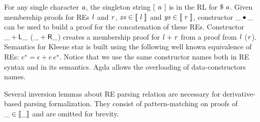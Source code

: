\documentclass[sigplan, anonymous, review]{acmart}
\theoremstyle{definition}
\newcommand{\D}[1]{\blue{\mathsf{#1}}}
\newcommand{\C}[1]{\red{\mathsf{#1}}}
\newcommand{\V}[1]{\purple{\mathit{#1}}}
\begin{document}
For any single character \ensuremath{\V{a}}, the singleton
string \ensuremath{[\mskip1.5mu \;\V{a}\;\mskip1.5mu]} is in the RL
for \ensuremath{\C{\$}\;\V{a}}. Given membership proofs for REs
\ensuremath{\V{l}} and \ensuremath{\V{r}}, \ensuremath{\V{xs}\;\D{\in\llbracket}\;\V{l}\;\D{\rrbracket}} and \ensuremath{\V{ys}\;\D{\in\llbracket}\;\V{r}\;\D{\rrbracket}}, constructor
\ensuremath{\C{\_\bullet\_}} can be used to build a proof
for the concatenation of these REs.  Constructor
\ensuremath{\C{\_+L\_}} (\ensuremath{\C{\_+R\_}}) creates a membership proof
for \ensuremath{\V{l}\;\C{+}\;\V{r}} from a proof from \ensuremath{\V{l}} (\ensuremath{\V{r}}). Semantics for Kleene star
is built using the following well known equivalence of REs: $e^\star
= \epsilon + e\,e^\star$. Notice that we use the same constructor names both in RE syntax and 
in its semantics. Agda allows the overloading of data-constructors names.

Several inversion lemmas about RE parsing relation are necessary for
derivative-based parsing formalization. They consist of
pattern-matching on proofs of
\ensuremath{\D{\_\in\llbracket\_\rrbracket}} and are omitted for
brevity.
\end{document}
